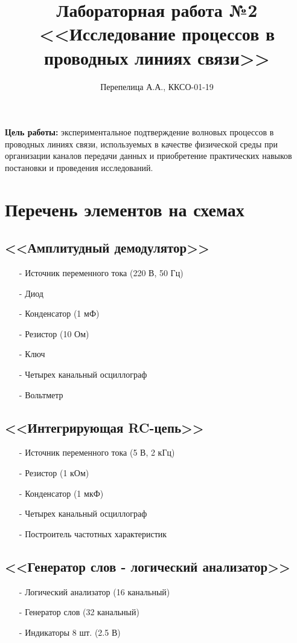 \documentclass[11pt]{article}
\title{\textbf{Лабораторная работа №2\\<<Исследование процессов в проводных линиях связи>>}}
\author{Перепелица А.А., ККСО-01-19}
\date{}
\begin{document}
\maketitle
\thispagestyle{empty}
\textbf{Цель работы:} экспериментальное подтверждение волновых процессов в проводных линиях связи, используемых в качестве физической среды при организации каналов передачи данных и приобретение практических навыков постановки и проведения исследований.
\section{Перечень элементов на схемах}
\subsection{<<Амплитудный демодулятор>>}
\begin{itemize}
    \item[-] Источник переменного тока (220 В, 50 Гц)
    \item[-] Диод
    \item[-] Конденсатор (1 мФ)
    \item[-] Резистор (10 Ом)
    \item[-] Ключ
    \item[-] Четырех канальный осциллограф
    \item[-] Вольтметр
\end{itemize}
\subsection{<<Интегрирующая RC-цепь>>}
\begin{itemize}
    \item[-] Источник переменного тока (5 В, 2 кГц)
    \item[-] Резистор (1 кОм)
    \item[-] Конденсатор (1 мкФ)
    \item[-] Четырех канальный осциллограф
    \item[-] Построитель частотных характеристик
\end{itemize}
\subsection{<<Генератор слов - логический анализатор>>}
\begin{itemize}
    \item[-] Логический анализатор (16 канальный)
    \item[-] Генератор слов (32 канальный)
    \item[-] Индикаторы 8 шт. (2.5 В)
\end{itemize}
\end{document}
